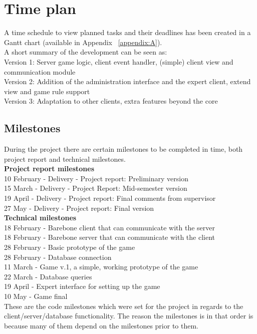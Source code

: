\section{Time plan}
A time schedule to view planned tasks and their deadlines has been created in a 
Gantt chart (available in Appendix ~\ref{appendix:A}). 
\\\newline
A short summary of the development can be seen as:\\
Version 1: Server game logic, client event handler, (simple) client view and 
communication module \\
Version 2: Addition of the administration interface and the expert client, 
extend view and game rule support\\
Version 3: Adaptation to other clients, extra features beyond the core \\

\subsection{Milestones} 
During the project there are certain milestones to be completed in time, both project report and technical milestones. \\
\newline
\textbf{Project report milestones}\\
10 February - Delivery - Project report: Preliminary version\\
15 March - Delivery - Project Report: Mid-semester version\\
19 April - Delivery - Project report: Final comments from supervisor\\
27 May - Delivery - Project report: Final version\\
\newline
\textbf{Technical milestones} \\
18 February - Barebone client that can communicate with the server \\
18 February - Barebone server that can communicate with the client\\
28 February - Basic prototype of the game\\
28 February - Database connection\\
11 March - Game v.1, a simple, working prototype of the game\\
22 March - Database queries\\
19 April - Expert interface for setting up the game\\
10 May - Game final\\
\newline
These are the code milestones which were set for the project in regards to the 
client/server/database functionality. The reason the milestones is in that 
order is because many of them depend on the milestones prior to them. \\


